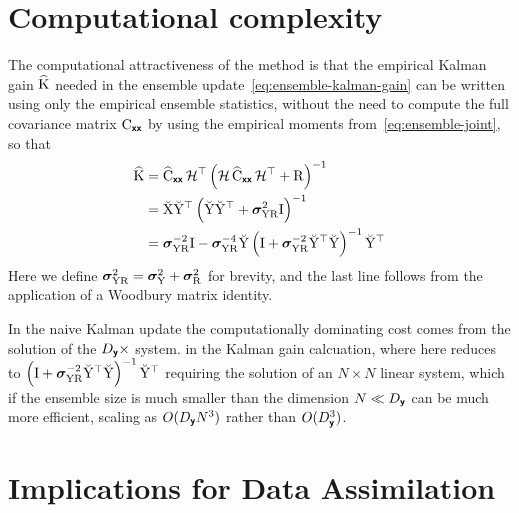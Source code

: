 \documentclass{article}
\begin{document}
\section{Computational complexity}

The computational attractiveness of the method is that the empirical Kalman gain \(\widehat{\mathrm{K}}\) needed in the ensemble update~\eqref{eq:ensemble-kalman-gain} can be written using only the empirical ensemble statistics, without the need to compute the full covariance matrix \(\mathrm{C}_{\boldsymbol{\mathsf{xx}}}\) by using the empirical moments from~\eqref{eq:ensemble-joint}, so that
\begin{align}
    \widehat{\mathrm{K}}&= \widehat{\mathrm{C}}_{\boldsymbol{\mathsf{xx}}}\, \mathcal{H}^\top \left(\mathcal{H}\,\widehat{\mathrm{C}}_{\boldsymbol{\mathsf{xx}}}\, \mathcal{H}^\top + \mathrm{R}\right)^{-1}\\
    &= \breve{\mathrm{X}} \breve{\mathrm{Y}}^\top   \left(
        \breve{\mathrm{Y}} \breve{\mathrm{Y}}^\top + \boldsymbol{\sigma}_{\mathrm{Y}\mathrm{R}}^2 \mathrm{I}
    \right)^{-1}\\
    &= \boldsymbol{\sigma}_{\mathrm{Y}\mathrm{R}}^{-2}\mathrm{I}
    - \boldsymbol{\sigma}_{\mathrm{Y}\mathrm{R}}^{-4}\breve{\mathrm{Y}}
    \left(
        \mathrm{I} + \boldsymbol{\sigma}_{\mathrm{Y}\mathrm{R}}^{-2}\breve{\mathrm{Y}}^\top\breve{\mathrm{Y}}
    \right)^{-1}
    \breve{\mathrm{Y}}^\top
\end{align}
Here we define \( \boldsymbol{\sigma}_{\mathrm{Y}\mathrm{R}}^2 =\boldsymbol{\sigma}_{\mathrm{Y}}^2 + \boldsymbol{\sigma}_{\mathrm{R}}^2\) for brevity, and the last line follows from the application of a Woodbury matrix identity.

In the naive Kalman update the computationally dominating cost comes from the solution of the \(D_{\boldsymbol{\mathsf{y}}}\times\) system. in the Kalman gain calcuation, where here reduces to   \(\left(
    \mathrm{I} + \boldsymbol{\sigma}_{\mathrm{Y}\mathrm{R}}^{-2}\breve{\mathrm{Y}}^\top\breve{\mathrm{Y}}
\right)^{-1}
\breve{\mathrm{Y}}^\top\) requiring the solution of an \(N\times N\) linear system, which if the ensemble size is much smaller than the dimension $N\ll D_{\boldsymbol{\mathsf{y}}}$ can be much more efficient, scaling as \(O(D_{\boldsymbol{\mathsf{y}}}N^3)\) rather than \(O(D_{\boldsymbol{\mathsf{y}}}^3)\).



\citep{Sriperumbudur2010Hilbert}




\section{Implications for Data Assimilation}
\end{document}
